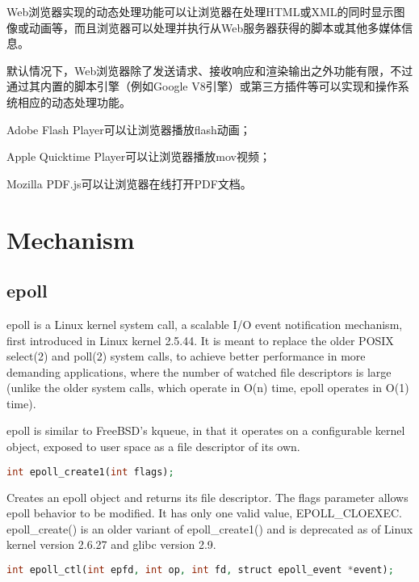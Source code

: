 Web浏览器实现的动态处理功能可以让浏览器在处理HTML或XML的同时显示图像或动画等，而且浏览器可以处理并执行从Web服务器获得的脚本或其他多媒体信息。

默认情况下，Web浏览器除了发送请求、接收响应和渲染输出之外功能有限，不过通过其内置的脚本引擎（例如Google V8引擎）或第三方插件等可以实现和操作系统相应的动态处理功能。



\begin{compactitem}
\item Adobe Flash Player可以让浏览器播放flash动画；
\item Apple Quicktime Player可以让浏览器播放mov视频；
\item Mozilla PDF.js可以让浏览器在线打开PDF文档。
\end{compactitem}


\section{Mechanism}


\subsection{epoll}

epoll is a Linux kernel system call, a scalable I/O event notification mechanism, first introduced in Linux kernel 2.5.44. It is meant to replace the older POSIX select(2) and poll(2) system calls, to achieve better performance in more demanding applications, where the number of watched file descriptors is large (unlike the older system calls, which operate in O(n) time, epoll operates in O(1) time). 

epoll is similar to FreeBSD's kqueue, in that it operates on a configurable kernel object, exposed to user space as a file descriptor of its own.


\begin{lstlisting}[language=PHP]
int epoll_create1(int flags);
\end{lstlisting}

Creates an epoll object and returns its file descriptor. The flags parameter allows epoll behavior to be modified. It has only one valid value, EPOLL\_CLOEXEC. epoll\_create() is an older variant of epoll\_create1() and is deprecated as of Linux kernel version 2.6.27 and glibc version 2.9.




\begin{lstlisting}[language=PHP]
int epoll_ctl(int epfd, int op, int fd, struct epoll_event *event);
\end{lstlisting}

